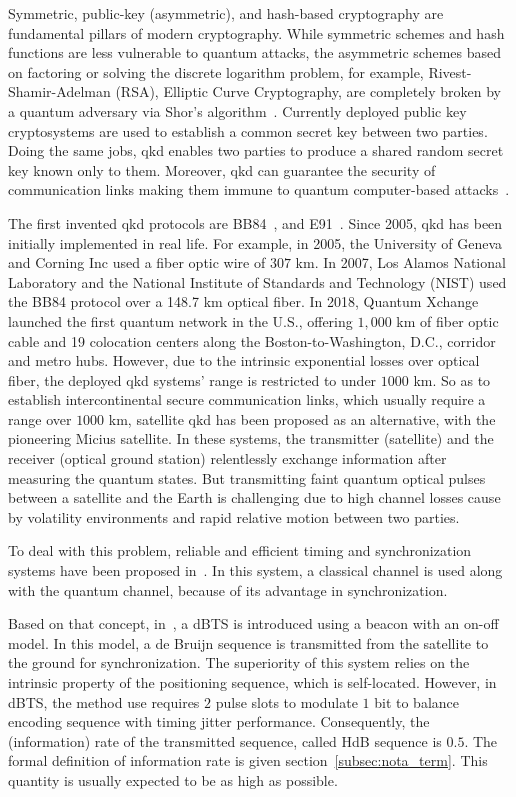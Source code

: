 Symmetric, public-key (asymmetric), and hash-based cryptography are fundamental pillars of modern cryptography. While symmetric schemes and hash functions are less vulnerable to quantum attacks, the asymmetric schemes based on factoring or solving the discrete logarithm problem, for example, Rivest-Shamir-Adelman (RSA), Elliptic Curve Cryptography, are completely broken by a quantum adversary via Shor's algorithm~\cite{shor1999polynomial}. Currently deployed public key cryptosystems are used to establish a common secret key between two parties. Doing the same jobs, \gls{qkd} enables two parties to produce a shared random secret key known only to them. Moreover, \gls{qkd} can guarantee the security of communication links making them immune to quantum computer-based attacks~\cite{gheorghiu2019benchmarking}. 

The first invented \gls{qkd} protocols are BB84~\cite{bennett1984quantum}, and E91~\cite{ekert1992quantum}. Since 2005, \gls{qkd} has been initially implemented in real life. For example, in 2005, the University of Geneva and Corning Inc used a fiber optic wire of $307$ km. In 2007, Los Alamos National Laboratory and the National Institute of Standards and Technology (NIST) used the BB84 protocol over a 148.7 km optical fiber. In 2018, Quantum Xchange launched the first quantum network in the U.S., offering $1,000$ km of fiber optic cable and 19 colocation centers along the Boston-to-Washington, D.C., corridor and metro hubs. However, due to the intrinsic exponential losses over optical fiber, the deployed \gls{qkd} systems' range is restricted to under $1000$ km. So as to establish intercontinental secure communication links, which usually require a range over $1000$ km, satellite \gls{qkd} has been proposed as an alternative, with the pioneering Micius satellite. In these systems, the transmitter (satellite) and the receiver (optical ground station) relentlessly exchange information after measuring the quantum states. But transmitting faint quantum optical pulses between a satellite and the Earth is challenging due to high channel losses cause by volatility environments and rapid relative motion between two parties. 

To deal with this problem, reliable and efficient timing and synchronization systems have been proposed in~\cite{khader2018time,duan2021survey}. In this system, a classical channel is used along with the quantum channel, because of its advantage in synchronization. 

Based on that concept, in~\cite{zhang2021timing}, a \gls{dBTS} is introduced using a beacon with an on-off model. In this model, a de Bruijn sequence is transmitted from the satellite to the ground for synchronization. The superiority of this system relies on the intrinsic property of the positioning sequence, which is self-located. However, in \gls{dBTS}, the method \cite{zhang2021timing} use requires $2$ pulse slots to modulate $1$ bit to balance encoding sequence with timing jitter performance. Consequently, the (information) rate of the transmitted sequence, called \gls{HdB} sequence is $0.5$. The formal definition of information rate is given section~\ref{subsec:nota_term}. This quantity is usually expected to be as high as possible. 

